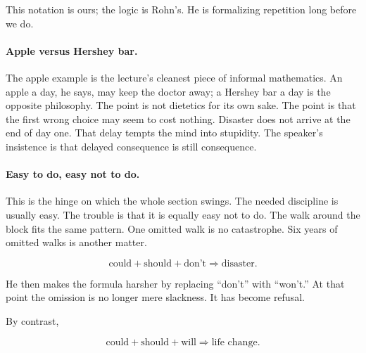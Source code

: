 This notation is ours; the logic is Rohn's. He is formalizing repetition long before we do.

\paragraph{Apple versus Hershey bar.}
The apple example is the lecture's cleanest piece of informal mathematics. An apple a day, he says, may keep the doctor away; a Hershey bar a day is the opposite philosophy. The point is not dietetics for its own sake. The point is that the first wrong choice may seem to cost nothing. Disaster does not arrive at the end of day one. That delay tempts the mind into stupidity. The speaker's insistence is that delayed consequence is still consequence.

\paragraph{Easy to do, easy not to do.}
This is the hinge on which the whole section swings. The needed discipline is usually easy. The trouble is that it is equally easy not to do. The walk around the block fits the same pattern. One omitted walk is no catastrophe. Six years of omitted walks is another matter.

\begin{equation}
\text{could}+\text{should}+\text{don't}\Rightarrow \text{disaster}.
\end{equation}

He then makes the formula harsher by replacing ``don't'' with ``won't.'' At that point the omission is no longer mere slackness. It has become refusal.

By contrast,

\begin{equation}
\text{could}+\text{should}+\text{will}\Rightarrow \text{life change}.
\end{equation}


